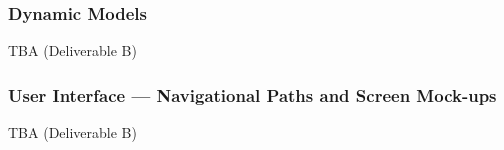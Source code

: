\documentclass[a4paper, 11pt, titlepage]{article}
\begin{document}
\subsubsection{Dynamic Models}
TBA (Deliverable B)

\subsubsection{User Interface --- Navigational Paths and Screen Mock-ups}
TBA (Deliverable B)


%
%

%
\end{document}
